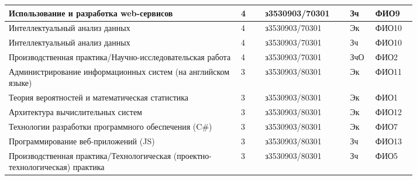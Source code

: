 \begin{table}[htbp]
\begin{tabular}{|p{0.48\linewidth}|p{0.05\linewidth}|p{0.16\linewidth}|p{0.04\linewidth}|p{0.08\linewidth}|}
		Использование и разработка web-сервисов                                       & 4                                                & з3530903/70301                                     & Зч                                                         & ФИО9          \\	\hline
		Интеллектуальный анализ данных                                                & 4                                                & з3530903/70301                                     & Эк                                                         & ФИО10         \\ 	\hline
		Интеллектуальный анализ данных                                                & 4                                                & з3530903/70301                                     & Зч                                                         & ФИО10         \\ 	\hline
		Производственная практика/Научно-исследовательская работа                     & 4                                                & з3530903/70301                                     & ЗчО                                                        & ФИО2          \\	\hline
		Администрирование информационных систем (на английском языке)                 & 3                                                & з3530903/80301                                     & Эк                                                         & ФИО11         \\	\hline
		Теория вероятностей и математическая статистика                               & 3                                                & з3530903/80301                                     & Эк                                                         & ФИО1          \\	\hline
		Архитектура вычислительных систем                                             & 3                                                & з3530903/80301                                     & Эк                                                         & ФИО12         \\
		Технологии разработки программного обеспечения (C\#)                          & 3                                                & з3530903/80301                                     & Эк                                                         & ФИО7          \\	\hline
		Программирование веб-приложений (JS)                                          & 3                                                & з3530903/80301                                     & Зч                                                         & ФИО13         \\	\hline
		Производственная практика/Технологическая (проектно-технологическая) практика & 3                                                & з3530903/80301                                     & Зч                                                         & ФИО5  \\	\hline       
	\end{tabular}
\end{table} \label{table:plan}
